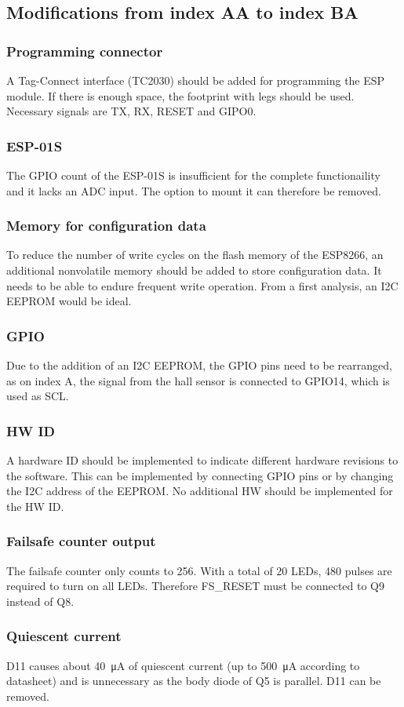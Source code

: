 \subsection{Modifications from index AA to index BA}

\subsubsection{Programming connector}
A Tag-Connect interface (TC2030) should be added for programming the ESP module. If there is enough space, the footprint with legs should be used. Necessary signals are TX, RX, RESET and GIPO0. 

\subsubsection{ESP-01S}
The GPIO count of the ESP-01S is insufficient for the complete functionaility and it lacks an \ac{ADC} input. The option to mount it can therefore be removed. 

\subsubsection{Memory for configuration data}
To reduce the number of write cycles on the flash memory of the ESP8266, an additional nonvolatile memory should be added to store configuration data. It needs to be able to endure frequent write operation. From a first analysis, an \ac{I2C} \ac{EEPROM} would be ideal. 

\subsubsection{GPIO}
Due to the addition of an \ac{I2C} \ac{EEPROM}, the \ac{GPIO} pins need to be rearranged, as on index A, the signal from the hall sensor is connected to GPIO14, which is used as SCL. 

\subsubsection{HW ID}
A hardware ID should be implemented to indicate different hardware revisions to the software. This can be implemented by connecting GPIO pins or by changing the I2C address of the EEPROM. No additional HW should be implemented for the HW ID. 

\subsubsection{Failsafe counter output}
The failsafe counter only counts to 256. With a total of 20 \acp{LED}, 480 pulses are required to turn on all \acp{LED}. Therefore FS\_RESET must be connected to Q9 instead of Q8. 

\subsubsection{Quiescent current}
D11 causes about \SI{40}{\micro\ampere} of quiescent current (up to \SI{500}{\micro\ampere} according to datasheet) and is unnecessary as the body diode of Q5 is parallel. D11 can be removed. 
